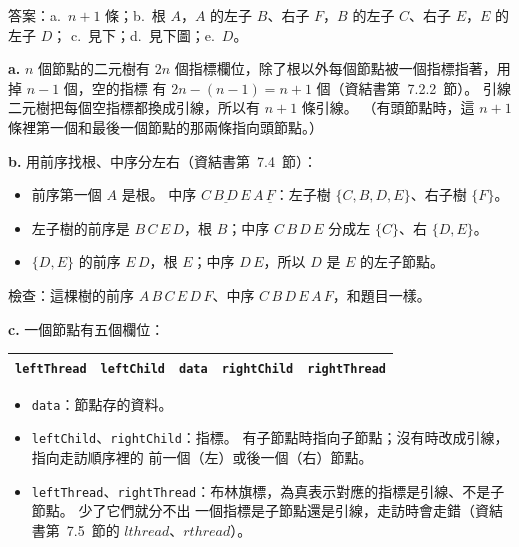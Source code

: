 \begin{pastsoln}
答案：a.\ $n + 1$ 條；b.\ 根 $A$，$A$ 的左子 $B$、右子 $F$，$B$ 的左子 $C$、右子 $E$，$E$ 的左子 $D$；
c.\ 見下；d.\ 見下圖；e.\ $D$。

\textbf{a.} $n$ 個節點的二元樹有 $2n$ 個指標欄位，除了根以外每個節點被一個指標指著，用掉 $n - 1$ 個，空的指標
有 $2n - (n - 1) = n + 1$ 個（資結書第~7.2.2~節）。 引線二元樹把每個空指標都換成引線，所以有 $n + 1$ 條引線。
（有頭節點時，這 $n + 1$ 條裡第一個和最後一個節點的那兩條指向頭節點。）

\textbf{b.} 用前序找根、中序分左右（資結書第~7.4~節）：
\begin{itemize}
\item 前序第一個 $A$ 是根。 中序 $\underline{C\,B\,D\,E}\,A\,\underline{F}$：左子樹 $\{C, B, D, E\}$、右子樹 $\{F\}$。
\item 左子樹的前序是 $B\,C\,E\,D$，根 $B$；中序 $C\,B\,D\,E$ 分成左 $\{C\}$、右 $\{D, E\}$。
\item $\{D, E\}$ 的前序 $E\,D$，根 $E$；中序 $D\,E$，所以 $D$ 是 $E$ 的左子節點。
\end{itemize}
\begin{center}
\end{center}
檢查：這棵樹的前序 $A\,B\,C\,E\,D\,F$、中序 $C\,B\,D\,E\,A\,F$，和題目一樣。

\textbf{c.} 一個節點有五個欄位：
\begin{center}
\begin{tabular}{|c|c|c|c|c|}
\hline
\texttt{leftThread} & \texttt{leftChild} & \texttt{data} & \texttt{rightChild} & \texttt{rightThread} \\
\hline
\end{tabular}
\end{center}
\begin{itemize}
\item \texttt{data}：節點存的資料。
\item \texttt{leftChild}、\texttt{rightChild}：指標。 有子節點時指向子節點；沒有時改成引線，指向走訪順序裡的
前一個（左）或後一個（右）節點。
\item \texttt{leftThread}、\texttt{rightThread}：布林旗標，為真表示對應的指標是引線、不是子節點。 少了它們就分不出
一個指標是子節點還是引線，走訪時會走錯（資結書第~7.5~節的 $\mathit{lthread}$、$\mathit{rthread}$）。
\end{itemize}


\end{pastsoln}
